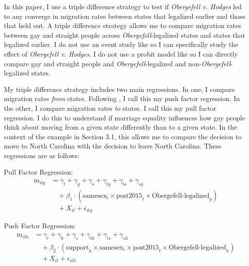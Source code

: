 \documentclass[12pt,letterpaper]{article}
\begin{document}
In this paper, I use a triple difference strategy to test if \textit{Obergefell v. Hodges} led to any converge in migration rates between states that legalized earlier and those that held out. A triple difference strategy allows me to compare migration rates between gay and straight people across \textit{Obergefell}-legalized states and states that legalized earlier. I do not use an event study like \citet{1} so I can specifically study the effect of \textit{Obergefell v. Hodges}. I do not use a probit model like \citet{12} so I can directly compare gay and straight people and \textit{Obergefell}-legalized and non-\textit{Obergefell}-legalized states.

My triple difference strategy includes two main regressions. In one, I compare migration rates \textit{from} states. Following \citet{12}, I call this my push factor regression. In the other, I compare migration rates \textit{to} states. I call this my pull factor regression. I do this to understand if marriage equality influences how gay people think about moving from a given state differently than to a given state. In the context of the example in Section 3.1, this allows me to compare the decision to move to North Carolina with the decision to leave North Carolina. These regressions are as follows:


\hfill
\break
Pull Factor Regression:
\begin{equation}
\begin{aligned}
\text{m}_{itg} &= \gamma_t + \gamma_g + \gamma_s + \gamma_{tg} + \gamma_{ts} + \gamma_{sg} \\
&\quad + \beta_1 \cdot (\text{samesex}_i \times \text{post2015}_t \times \text{Obergefell-legalized}_g) \\
&\quad + X_{it} + \epsilon_{itg}
\end{aligned}
\end{equation}

\hfill
\break
Push Factor Regression:
\begin{equation}
\begin{aligned}
\text{m}_{ith} &= \gamma_t + \gamma_h + \gamma_s + \gamma_{th} + \gamma_{ts} + \gamma_{sh} \\
&\quad + \beta_2 \cdot (\text{support}_h \times \text{samesex}_i \times \text{post2015}_t \times \text{Obergefell-legalized}_h) \\
&\quad + X_{it} + \epsilon_{ith}
\end{aligned}
\end{equation}
\end{document}
